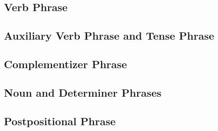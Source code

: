 \subsection{Verb Phrase}

\subsection{Auxiliary Verb Phrase and Tense Phrase}

\subsection{Complementizer Phrase}
\label{sec:cp}

\subsection{Noun and Determiner Phrases}
\label{sec:np}

\subsection{Postpositional Phrase}


